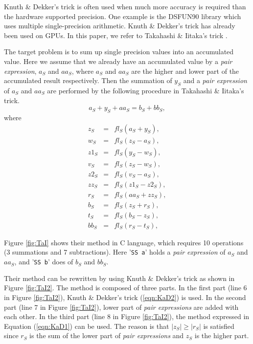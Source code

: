 Knuth \& Dekker's trick is often used when much more accuracy is
required than the hardware supported precision. One example is the
DSFUN90 library \cite{highprecisionlib} which uses multiple
single-precision arithmetic.  Knuth \& Dekker's trick has already been
used on GPUs.  In this paper, we refer to Takahashi \& Iitaka's trick
\cite{Takahashi1, Takahashi2}.

The target problem is to sum up single precision values into
an accumulated value. Here we assume that 
we already have an accumulated value
by a {\it pair expression}, $a_S$ and $aa_S$, where $a_S$ and $aa_S$
are the higher and lower part of the accumulated result respectively.
Then the summation of $y_S$ and a {\it pair expression} of $a_S$ and $aa_S$
are performed by the following procedure in Takahashi \& 
Iitaka's trick.
\begin{equation}
a_S + y_S + aa_S = b_S + bb_S,
\end{equation}
where
\begin{eqnarray}
z_S  &=& fl_S( a_S + y_S ),\nonumber \\
w_S  &=& fl_S( z_S - a_S ),\nonumber \\
z1_S &=& fl_S( y_S - w_S ),\nonumber \\
v_S  &=& fl_S( z_S - w_S ),\nonumber \\
z2_S &=& fl_S( v_S - a_S ),\nonumber \\
zz_S &=& fl_S( z1_S - z2_S ),\label{eqn:TaI}\\
r_S  &=& fl_S( aa_S + zz_S ),\nonumber \\
b_S  &=& fl_S( z_S  + r_S  ),\nonumber \\
t_S  &=& fl_S( b_S  - z_S  ),\nonumber \\
bb_S &=& fl_S( r_S  - t_S  ),\nonumber 
\end{eqnarray}
%

Figure \ref{fig:TaI} shows their method in C language, 
which requires 10 operations (3 summations and 7 subtractions).
Here '{\tt SS a}' holds a {\it pair expression} of $a_S$ and $aa_S$,
and '{\tt SS b}' does of $b_S$ and $bb_S$.

Their method can be rewritten by using Knuth \& Dekker's trick
as shown in Figure \ref{fig:TaI2}.
The method is composed of three parts.
In the first part (line 6 in Figure \ref{fig:TaI2}),
Knuth \& Dekker's trick (\ref{eqn:KaD2}) is used.
In the second part (line 7 in Figure \ref{fig:TaI2}), 
lower part of {\it pair expressions} are added with each other.
In the third part (line 8 in Figure \ref{fig:TaI2}),
the method expressed in Equation (\ref{eqn:KaD1}) can be used.
The reason is that $|z_S|\geq |r_S|$ is satisfied
since $r_S$ is the sum of the lower part of {\it pair expressions}
and $z_S$ is the higher part.


